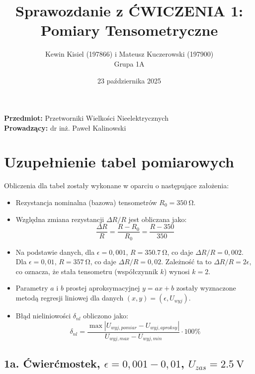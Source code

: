 \documentclass[12pt, a4paper]{article}
\title{Sprawozdanie z ĆWICZENIA 1: Pomiary Tensometryczne}
\author{Kewin Kisiel (197866) i Mateusz Kuczerowski (197900) \\ Grupa 1A}
\date{23 października 2025}
\begin{document}
	
	\maketitle
	\noindent \textbf{Przedmiot:} Przetworniki Wielkości Nieelektrycznych \\
	\textbf{Prowadzący:} dr inż. Paweł Kalinowski \\
	\hrulefill
	
	\section{Uzupełnienie tabel pomiarowych}
	
	Obliczenia dla tabel zostały wykonane w oparciu o następujące założenia:
	\begin{itemize}
		\item Rezystancja nominalna (bazowa) tensometrów $R_0 = \SI{350}{\ohm}$.
		\item Względna zmiana rezystancji $\Delta R / R$ jest obliczana jako:
		$$ \frac{\Delta R}{R} = \frac{R - R_0}{R_0} = \frac{R - 350}{350} $$
		\item Na podstawie danych, dla $\epsilon = 0,001$, $R = \SI{350,7}{\ohm}$, co daje $\Delta R/R = 0,002$. Dla $\epsilon = 0,01$, $R = \SI{357}{\ohm}$, co daje $\Delta R/R = 0,02$. Zależność ta to $\Delta R/R = 2\epsilon$, co oznacza, że stała tensometru (współczynnik $k$) wynosi \textbf{$k=2$}.
		\item Parametry $a$ i $b$ prostej aproksymacyjnej $y = ax + b$ zostały wyznaczone metodą regresji liniowej dla danych $(x, y) = (\epsilon, U_{wyj})$.
		\item Błąd nieliniowości $\delta_{nl}$ obliczono jako:
		$$ \delta_{nl} = \frac{\max|U_{wyj, pomiar} - U_{wyj, aproksy}|}{U_{wyj, max} - U_{wyj, min}} \cdot 100\% $$
	\end{itemize}
	
	\subsection{1a. Ćwierćmostek, $\epsilon = 0,001-0,01$, $U_{zas} = \SI{2.5}{\volt}$}
	
\end{document}
